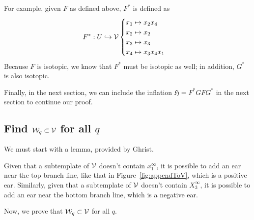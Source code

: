 \documentclass[paper.tex]{subfiles}
\begin{document}
For example, given $F$ as defined above, $F^*$ is defined as $$F^*: U \hookrightarrow \mathcal{V} \begin{cases} x_1 \mapsto x_2 x_4 \\ x_2 \mapsto x_2 \\ x_3 \mapsto x_3 \\ x_4 \mapsto x_3 x_4 x_1 \end{cases}$$ Because $F$ is isotopic, we know that $F^*$ must be isotopic as well; in addition, $G^*$ is also isotopic.

    Finally, in the next section, we can include the inflation $\mathfrak{H} = F^* G F G^*$ in the next section to continue our proof.


\subsection{Find $\mathcal{W}_q \subset \mathcal{V}$ for all $q$}

We must start with a lemma, provided by Ghrist.
\begin{lemma}[Ghrist 1997]
    Given that a subtemplate of $\mathcal{V}$ doesn't contain $x_1^\infty$, it is possible to add an ear near the top branch line, like that in Figure~\ref{fig:appendToV}, which is a positive ear. Similarly, given that a subtemplate of $\mathcal{V}$ doesn't contain $X_3^\infty$, it is possible to add an ear near the bottom branch line, which is a negative ear.
\end{lemma}


Now, we prove that $\mathcal{W}_q \subset \mathcal{V}$ for all $q$. 
\end{document}
